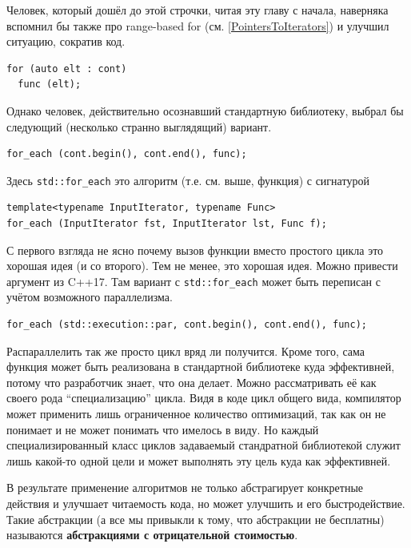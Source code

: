 \documentclass[a4paper,12pt,oneside]{article}
\begin{document}
Человек, который дошёл до этой строчки, читая эту главу с начала, наверняка вспомнил бы также про range-based for (см. \ref{PointersToIterators}) и улучшил ситуацию, сократив код.

\begin{lstlisting}
for (auto elt : cont)
  func (elt);
\end{lstlisting}

Однако человек, действительно осознавший стандартную библиотеку, выбрал бы следующий (несколько странно выглядящий) вариант.

\begin{lstlisting}
for_each (cont.begin(), cont.end(), func);
\end{lstlisting}

Здесь \lstinline!std::for_each! это алгоритм (т.е. см. выше, функция) с сигнатурой

\begin{lstlisting}
template<typename InputIterator, typename Func>
for_each (InputIterator fst, InputIterator lst, Func f);
\end{lstlisting}

С первого взгляда не ясно почему вызов функции вместо простого цикла это хорошая идея (и со второго). Тем не менее, это хорошая идея. Можно привести аргумент из C++17. Там вариант с \lstinline!std::for_each! может быть переписан с учётом возможного параллелизма.

\begin{lstlisting}
for_each (std::execution::par, cont.begin(), cont.end(), func);
\end{lstlisting}

Распараллелить так же просто цикл вряд ли получится. Кроме того, сама функция может быть реализована в стандартной библиотеке куда эффективней, потому что разработчик знает, что она делает. Можно рассматривать её как своего рода ``специализацию'' цикла. Видя в коде цикл общего вида, компилятор может применить лишь ограниченное количество оптимизаций, так как он не понимает и не может понимать что имелось в виду. Но каждый специализированный класс циклов задаваемый стандратной библиотекой служит лишь какой-то одной цели и может выполнять эту цель куда как эффективней.

В результате применение алгоритмов не только абстрагирует конкретные действия и улучшает читаемость кода, но может улучшить и его быстродействие. Такие абстракции (а все мы привыкли к тому, что абстракции не бесплатны) называются \textbf{абстракциями с отрицательной стоимостью}.
\end{document}
